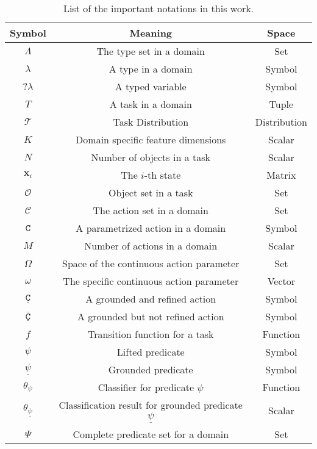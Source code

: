 \begin{table}[!t]
    \centering
    \setlength{\tabcolsep}{1mm}
    \fontsize{8}{10}\selectfont
    \caption{List of the important notations in this work.}
    \begin{tabular}{ccc}
        \toprule[1.5pt]
        \textbf{Symbol}	& \textbf{Meaning}  & \textbf{Space}  \\
        \midrule
        $\Lambda$ & The type set in a domain & Set \\
        $\lambda$ & A type in a domain & Symbol \\
        $\mathtt{?\lambda}$ & A typed variable & Symbol \\
        $T$ & A task in a domain & Tuple \\
        $\mathcal{T}$ & Task Distribution & Distribution \\
        $K$ & Domain specific feature dimensions & Scalar \\
        $N$ & Number of objects in a task & Scalar \\
        $\mathbf{x}_i$ & The $i$-th state & Matrix \\
        $\mathcal{O}$ & Object set in a task & Set \\
        $\mathcal{C}$ & The action set in a domain & Set \\
        $\mathtt{C}$ & A parametrized action in a domain & Symbol \\
        $M$ & Number of actions in a domain & Scalar \\
        $\Omega$ & Space of the continuous action parameter & Set \\
        $\omega$ & The specific continuous action parameter & Vector \\
        $\underline{\mathtt{C}}$ & A grounded and refined action& Symbol \\
        $\underline{\bar{\mathtt{C}}}$ & A grounded but not refined action& Symbol \\
        $f$ & Transition function for a task & Function \\
        $\psi$ & Lifted predicate & Symbol \\
        $\underline{\psi}$ & Grounded predicate & Symbol \\
        $\theta_\psi$ & Classifier for predicate $\psi$ & Function \\
        $\theta_{\underline{\psi}}$ & Classification result for grounded predicate $\underline{\psi}$ & Scalar \\
        $\Psi$ & Complete predicate set for a domain & Set \\

\end{tabular}
\end{table}
